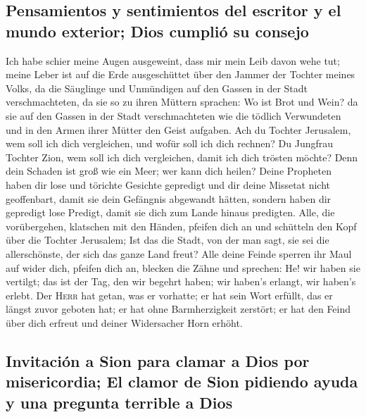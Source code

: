 \hypertarget{pensamientos-y-sentimientos-del-escritor-y-el-mundo-exterior-dios-cumpliuxf3-su-consejo}{%
\subsection{Pensamientos y sentimientos del escritor y el mundo
exterior; Dios cumplió su
consejo}\label{pensamientos-y-sentimientos-del-escritor-y-el-mundo-exterior-dios-cumpliuxf3-su-consejo}}

 Ich habe schier meine Augen ausgeweint, dass mir mein
Leib davon wehe tut; meine Leber ist auf die Erde ausgeschüttet über den
Jammer der Tochter meines Volks, da die Säuglinge und Unmündigen auf den
Gassen in der Stadt verschmachteten,  da sie so zu ihren
Müttern sprachen: Wo ist Brot und Wein? da sie auf den Gassen in der
Stadt verschmachteten wie die tödlich Verwundeten und in den Armen ihrer
Mütter den Geist aufgaben.  Ach du Tochter Jerusalem, wem
soll ich dich vergleichen, und wofür soll ich dich rechnen? Du Jungfrau
Tochter Zion, wem soll ich dich vergleichen, damit ich dich trösten
möchte? Denn dein Schaden ist groß wie ein Meer; wer kann dich heilen?
 Deine Propheten haben dir lose und törichte Gesichte
gepredigt und dir deine Missetat nicht geoffenbart, damit sie dein
Gefängnis abgewandt hätten, sondern haben dir gepredigt lose Predigt,
damit sie dich zum Lande hinaus predigten.  Alle, die
vorübergehen, klatschen mit den Händen, pfeifen dich an und schütteln
den Kopf über die Tochter Jerusalem; Ist das die Stadt, von der man
sagt, sie sei die allerschönste, der sich das ganze Land freut?
 Alle deine Feinde sperren ihr Maul auf wider dich,
pfeifen dich an, blecken die Zähne und sprechen: He! wir haben sie
vertilgt; das ist der Tag, den wir begehrt haben; wir haben's erlangt,
wir haben's erlebt.  Der \textsc{Herr} hat getan, was er
vorhatte; er hat sein Wort erfüllt, das er längst zuvor geboten hat; er
hat ohne Barmherzigkeit zerstört; er hat den Feind über dich erfreut und
deiner Widersacher Horn erhöht.

\hypertarget{invitaciuxf3n-a-sion-para-clamar-a-dios-por-misericordia-el-clamor-de-sion-pidiendo-ayuda-y-una-pregunta-terrible-a-dios}{%
\subsection{Invitación a Sion para clamar a Dios por misericordia; El
clamor de Sion pidiendo ayuda y una pregunta terrible a
Dios}\label{invitaciuxf3n-a-sion-para-clamar-a-dios-por-misericordia-el-clamor-de-sion-pidiendo-ayuda-y-una-pregunta-terrible-a-dios}}

